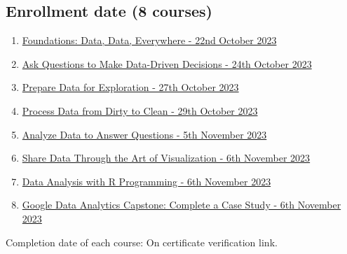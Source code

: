 \documentclass[]{article}
\begin{document}
\subsection{Enrollment date (8 courses)}
\begin{enumerate}
  \item \href{https://www.coursera.org/account/accomplishments/certificate/S9CWWMGFJAMM}{Foundations: Data, Data, Everywhere - 22nd October 2023}
  \item \href{https://www.coursera.org/account/accomplishments/certificate/ZA7TH6KEEEPB}{Ask Questions to Make Data-Driven Decisions - 24th October 2023}
  \item \href{https://www.coursera.org/account/accomplishments/certificate/B7PZ38G3U9XR}{Prepare Data for Exploration - 27th October 2023}
  \item \href{https://www.coursera.org/account/accomplishments/certificate/DYHS63889XUN}{Process Data from Dirty to Clean - 29th October 2023}
  \item \href{https://www.coursera.org/account/accomplishments/certificate/6478SYGTR4HF}{Analyze Data to Answer Questions - 5th November 2023}
  \item \href{https://www.coursera.org/account/accomplishments/certificate/8JULNPUM3GLC}{Share Data Through the Art of Visualization - 6th November 2023}
  \item \href{https://www.coursera.org/account/accomplishments/certificate/JPHDNMYYDJZ9}{Data Analysis with R Programming - 6th November 2023}
  \item \href{https://www.coursera.org/account/accomplishments/certificate/7TN58662AD9X}{Google Data Analytics Capstone: Complete a Case Study - 6th November 2023}
\end{enumerate}
Completion date of each course: On certificate verification link.
\end{document}
